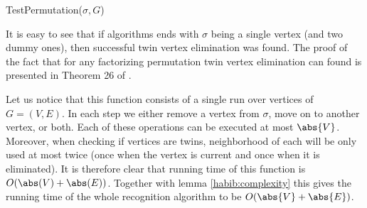 \begin{function}
    \caption{TestPermutation($\sigma, G$)}
    \label{habib:testperm}
    \DontPrintSemicolon

\end{function}

It is easy to see that if algorithms ends with $\sigma$ being a single vertex (and two dummy ones), then successful twin vertex elimination was found. The proof of the fact that for any factorizing permutation twin vertex elimination can found is presented in Theorem 26 of \cite{habib}.

Let us notice that this function consists of a single run over vertices of $G = (V,E)$. In each step we either remove a vertex from $\sigma$, move on to another vertex, or both. Each of these operations can be executed at most $\abs{V}$. Moreover, when checking if vertices are twins, neighborhood of each will be only used at most twice (once when the vertex is current and once when it is eliminated). It is therefore clear that running time of this function is $O(\abs(V) + \abs(E))$. Together with lemma \ref{habib:complexity} this gives the running time of the whole recognition algorithm to be $O(\abs{V} + \abs{E})$.